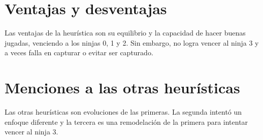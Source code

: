 \documentclass[a4paper, 11pt]{article}
\begin{document}
\section{Ventajas y desventajas}

Las ventajas de la heurística son su equilibrio y la capacidad de hacer buenas jugadas, venciendo a los ninjas 0, 1 y 2. Sin embargo, no logra vencer al ninja 3 y a veces falla en capturar o evitar ser capturado.

\section{Menciones a las otras heurísticas}

Las otras heurísticas son evoluciones de las primeras. La segunda intentó un enfoque diferente y la tercera es una remodelación de la primera para intentar vencer al ninja 3.
\end{document}

